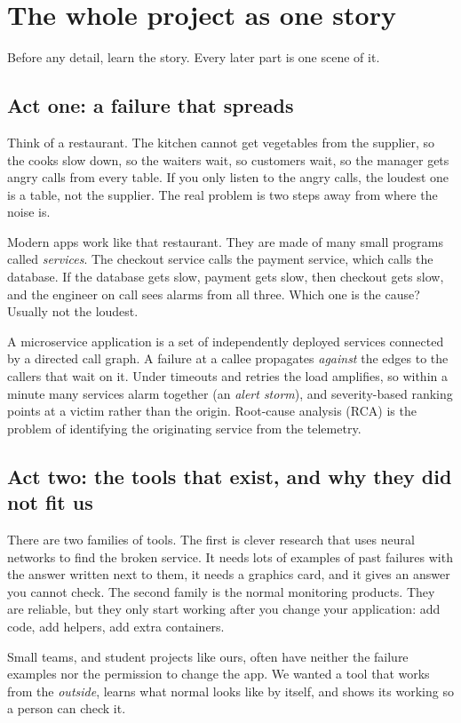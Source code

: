 \chapter{The whole project as one story}
\label{ch:story}

Before any detail, learn the story. Every later part is one scene of it.

\section{Act one: a failure that spreads}
\begin{simplebox}
Think of a restaurant. The kitchen cannot get vegetables from the supplier, so the cooks slow down, so the waiters wait, so customers wait, so the manager gets angry calls from every table. If you only listen to the angry calls, the loudest one is a table, not the supplier. The real problem is two steps away from where the noise is.

Modern apps work like that restaurant. They are made of many small programs called \emph{services}. The checkout service calls the payment service, which calls the database. If the database gets slow, payment gets slow, then checkout gets slow, and the engineer on call sees alarms from all three. Which one is the cause? Usually not the loudest.
\end{simplebox}

\begin{techbox}
A microservice application is a set of independently deployed services connected by a directed call graph. A failure at a callee propagates \emph{against} the edges to the callers that wait on it. Under timeouts and retries the load amplifies, so within a minute many services alarm together (an \emph{alert storm}), and severity-based ranking points at a victim rather than the origin. Root-cause analysis (RCA) is the problem of identifying the originating service from the telemetry.
\end{techbox}

\section{Act two: the tools that exist, and why they did not fit us}
\begin{simplebox}
There are two families of tools. The first is clever research that uses neural networks to find the broken service. It needs lots of examples of past failures with the answer written next to them, it needs a graphics card, and it gives an answer you cannot check. The second family is the normal monitoring products. They are reliable, but they only start working after you change your application: add code, add helpers, add extra containers.

Small teams, and student projects like ours, often have neither the failure examples nor the permission to change the app. We wanted a tool that works from the \emph{outside}, learns what normal looks like by itself, and shows its working so a person can check it.
\end{simplebox}

